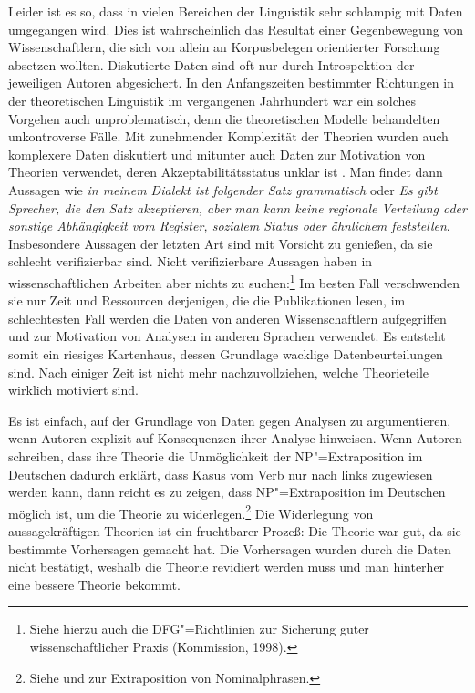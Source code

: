 Leider ist es so, dass in vielen Bereichen der Linguistik sehr schlampig mit Daten
umgegangen wird. Dies ist wahrscheinlich das Resultat einer Gegenbewegung
von Wissenschaftlern, die sich von allein an Korpusbelegen orientierter Forschung
absetzen wollten. Diskutierte Daten sind oft nur durch Introspektion der jeweiligen
Autoren abgesichert. In den Anfangszeiten bestimmter Richtungen
in der theoretischen Linguistik im vergangenen Jahrhundert war ein solches Vorgehen 
auch unproblematisch, denn die theoretischen Modelle behandelten unkontroverse Fälle.
Mit zunehmender Komplexität der Theorien wurden auch komplexere Daten diskutiert 
und mitunter auch Daten zur Motivation von Theorien verwendet, deren
Akzeptabilitätsstatus unklar ist \citep{Fanselow2004b}.
Man findet dann Aussagen wie \emph{in meinem Dialekt
ist folgender Satz grammatisch} oder \emph{Es gibt Sprecher, die den Satz akzeptieren,
aber man kann keine regionale Verteilung oder sonstige Abhängigkeit vom Register, sozialem
Status oder ähnlichem feststellen}. Insbesondere Aussagen der letzten Art sind mit Vorsicht
zu genießen, da sie schlecht verifizierbar sind. Nicht verifizierbare Aussagen haben
in wissenschaftlichen Arbeiten aber nichts zu suchen:\footnote{
  Siehe hierzu auch die DFG"=Richtlinien zur Sicherung guter wissenschaftlicher Praxis (Kommission, 1998)\nocite{DFG98a}.%
}
Im besten Fall verschwenden sie
nur Zeit und Ressourcen derjenigen, die die Publikationen lesen, im schlechtesten Fall werden die
Daten von anderen Wissenschaftlern aufgegriffen und zur Motivation von Analysen in
anderen Sprachen verwendet. Es entsteht somit ein riesiges Kartenhaus, dessen
Grundlage wacklige Datenbeurteilungen sind. Nach einiger Zeit ist nicht mehr nachzuvollziehen,
welche Theorieteile wirklich motiviert sind.

Es ist einfach, auf der Grundlage von Daten gegen Analysen zu argumentieren, wenn Autoren
explizit auf Konsequenzen ihrer Analyse hinweisen. Wenn Autoren \zb schreiben, dass ihre
Theorie die Unmöglichkeit der NP"=Extraposition im Deutschen dadurch erklärt, dass Kasus vom Verb
nur nach links zugewiesen werden kann, dann reicht es zu zeigen, dass NP"=Extraposition im Deutschen
möglich ist, um die Theorie zu widerlegen.\footnote{
  Siehe  und  zur Extraposition von Nominalphrasen.%
}
Die Widerlegung von aussagekräftigen Theorien ist ein fruchtbarer Prozeß: Die Theorie war gut,
da sie bestimmte Vorhersagen gemacht hat. Die Vorhersagen wurden durch die Daten nicht bestätigt,
weshalb die Theorie revidiert werden muss und man hinterher eine bessere Theorie bekommt.

